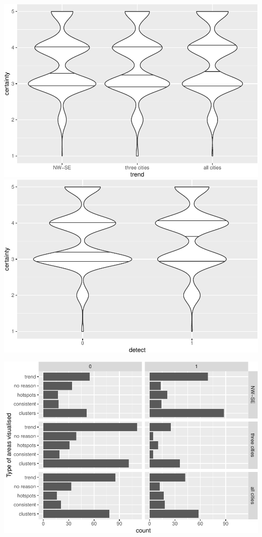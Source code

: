 \documentclass[conference,final,]{IEEEtran}
\makeatletter
\def\maxwidth{\ifdim\Gin@nat@width>\linewidth\linewidth
\else\Gin@nat@width\fi}
\let\Oldincludegraphics\includegraphics
\renewcommand{\includegraphics}[1]{\Oldincludegraphics[width=\maxwidth]{#1}}
\makeatother
\begin{document}
\includegraphics{survey_files/figure-latex/unnamed-chunk-10-1.pdf}
\includegraphics{survey_files/figure-latex/unnamed-chunk-10-2.pdf}

\includegraphics{survey_files/figure-latex/unnamed-chunk-11-1.pdf}
\end{document}
